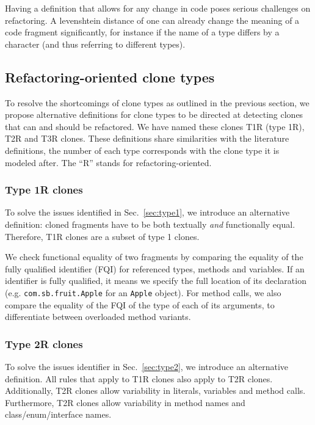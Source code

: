 \documentclass[a4paper]{article}
\begin{document}
Having a definition that allows for any change in code poses serious challenges on refactoring. A levenshtein distance of one can already change the meaning of a code fragment significantly, for instance if the name of a type differs by a character (and thus referring to different types).

\subsection{Refactoring-oriented clone types}\label{sec:rtypes}
To resolve the shortcomings of clone types as outlined in the previous section, we propose alternative definitions for clone types to be directed at detecting clones that can and should be refactored. We have named these clones T1R (type 1R), T2R and T3R clones. These definitions share similarities with the literature definitions, the number of each type corresponds with the clone type it is modeled after. The ``R'' stands for refactoring-oriented.

\subsubsection{Type 1R clones} \label{sec:type1r}
To solve the issues identified in Sec.~\ref{sec:type1}, we introduce an alternative definition: cloned fragments have to be both textually \textit{and} functionally equal. Therefore, T1R clones are a subset of type 1 clones.

We check functional equality of two fragments by comparing the equality of the fully qualified identifier (FQI) for referenced types, methods and variables. If an identifier is fully qualified, it means we specify the full location of its declaration (e.g. \texttt{com.sb.fruit.Apple} for an \texttt{Apple} object). For method calls, we also compare the equality of the FQI of the type of each of its arguments, to differentiate between overloaded method variants.

\subsubsection{Type 2R clones}\label{sec:type2r}
To solve the issues identifier in Sec.~\ref{sec:type2}, we introduce an alternative definition. All rules that apply to T1R clones also apply to T2R clones. Additionally, T2R clones allow variability in literals, variables and method calls. Furthermore, T2R clones allow variability in method names and class/enum/interface names.
\end{document}
